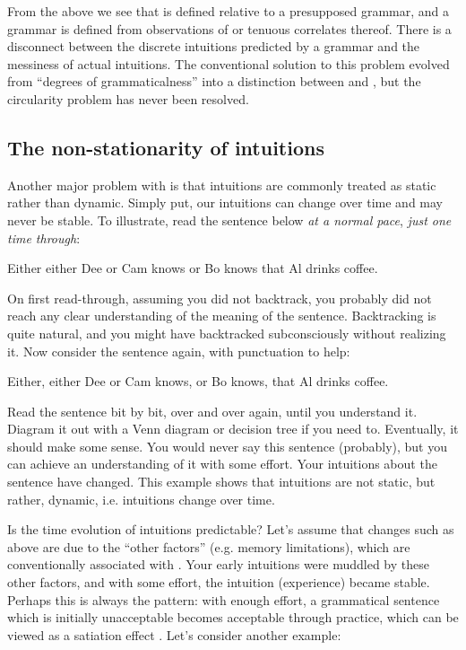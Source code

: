   From the above we see that  is defined relative to a presupposed grammar, and a grammar is defined from observations of  or tenuous correlates thereof. There is a disconnect between the discrete intuitions predicted by a grammar and the messiness of actual intuitions. The conventional solution to this problem evolved from “degrees of grammaticalness” into a distinction between  and , but the circularity problem has never been resolved. 

\subsection{The non-stationarity of intuitions}

Another major problem with  is that intuitions are commonly treated as static rather than dynamic. Simply put, our intuitions can change over time and may never be stable. To illustrate, read the sentence below \textit{at a normal pace}, \textit{just one time through}:

\ea
    {Either either Dee or Cam knows or Bo knows that Al drinks coffee.}
\z    

On first read-through, assuming you did not backtrack, you probably did not reach any clear understanding of the meaning of the sentence. Backtracking is quite natural, and you might have backtracked subconsciously without realizing it. Now consider the sentence again, with punctuation to help:

\ea
Either, either Dee or Cam knows, or Bo knows, that Al drinks coffee.
\z

  Read the sentence bit by bit, over and over again, until you understand it. Diagram it out with a Venn diagram or decision tree if you need to. Eventually, it should make some sense. You would never say this sentence (probably), but you can achieve an understanding of it with some effort. Your intuitions about the sentence have changed. This example shows that intuitions are not static, but rather, dynamic, i.e. intuitions change over time.

  Is the time evolution of intuitions predictable? Let's assume that changes such as above are due to the “other factors” (e.g. memory limitations), which are conventionally associated with . Your early intuitions were muddled by these other factors, and with some effort, the intuition (experience) became stable. Perhaps this is always the pattern: with enough effort, a grammatical sentence which is initially unacceptable becomes acceptable through practice, which can be viewed as a satiation effect \citep{Snyder2000}. Let's consider another example:

